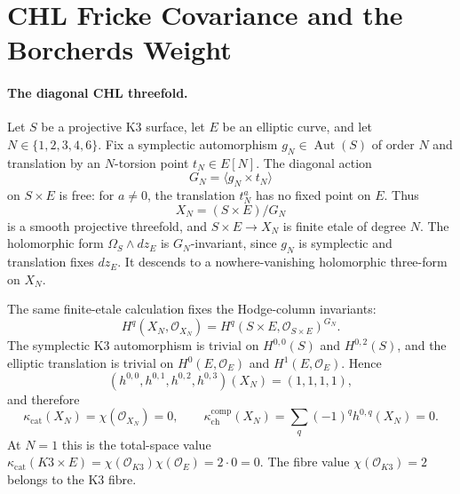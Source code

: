 %
%
\providecommand{\Z}{\mathbb{Z}}
\providecommand{\Q}{\mathbb{Q}}
\providecommand{\cO}{\mathcal{O}}
\providecommand{\kBKM}{\kappa_{\mathrm{BKM}}}
\providecommand{\kch}{\kappa_{\mathrm{ch}}}
\providecommand{\kcat}{\kappa_{\mathrm{cat}}}
\providecommand{\kfib}{\kappa_{\mathrm{fiber}}}
\providecommand{\Sp}{\mathrm{Sp}}
\providecommand{\Fuk}{\mathrm{Fuk}}
\providecommand{\PhiCHL}{\Phi^{\mathrm{CHL}}}
\providecommand{\Dfive}{D_5}
\providecommand{\Htwo}{\mathfrak{H}_2}

\section*{CHL Fricke Covariance and the Borcherds Weight}
\label{wn:sec:chl-fricke-covariance}

\paragraph{The diagonal CHL threefold.}
Let \(S\) be a projective K3 surface, let \(E\) be an elliptic curve,
and let \(N\in\{1,2,3,4,6\}\).  Fix a symplectic automorphism
\(g_N\in \operatorname{Aut}(S)\) of order \(N\) and translation by an
\(N\)-torsion point \(t_N\in E[N]\).  The diagonal action
\[
  G_N=\langle g_N\times t_N\rangle
\]
on \(S\times E\) is free: for \(a\ne 0\), the translation \(t_N^a\)
has no fixed point on \(E\).  Thus
\[
  X_N=(S\times E)/G_N
\]
is a smooth projective threefold, and \(S\times E\to X_N\) is finite
etale of degree \(N\).  The holomorphic form \(\Omega_S\wedge dz_E\)
is \(G_N\)-invariant, since \(g_N\) is symplectic and translation fixes
\(dz_E\).  It descends to a nowhere-vanishing holomorphic three-form on
\(X_N\).

The same finite-etale calculation fixes the Hodge-column invariants:
\[
  H^q(X_N,\cO_{X_N})
  =H^q(S\times E,\cO_{S\times E})^{G_N}.
\]
The symplectic K3 automorphism is trivial on \(H^{0,0}(S)\) and
\(H^{0,2}(S)\), and the elliptic translation is trivial on
\(H^0(E,\cO_E)\) and \(H^1(E,\cO_E)\).  Hence
\[
  (h^{0,0},h^{0,1},h^{0,2},h^{0,3})(X_N)=(1,1,1,1),
\]
and therefore
\[
  \kcat(X_N)=\chi(\cO_{X_N})=0,\qquad
  \kch^{\mathrm{comp}}(X_N)=\sum_q(-1)^q h^{0,q}(X_N)=0.
\]
At \(N=1\) this is the total-space value
\(\kcat(K3\times E)=\chi(\cO_{K3})\chi(\cO_E)=2\cdot0=0\).
The fibre value \(\chi(\cO_{K3})=2\) belongs to the K3 fibre.

